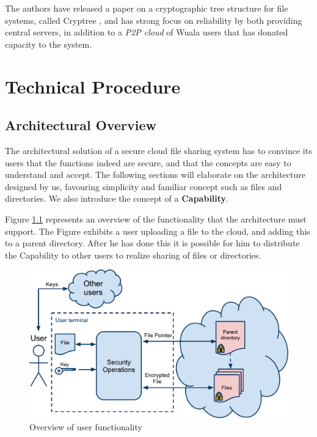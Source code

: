 \documentclass[pdftex,english,10pt,b5paper,twoside]{book}
\begin{document}
The authors have released a paper on a cryptographic tree structure for file
systems, called Cryptree \cite{cryptree}, and has strong focus on reliability
by both providing central servers, in addition to a \emph{P2P cloud} of Wuala
users that has donated capacity to the system.

\chapter{Technical Procedure}
\section{Architectural Overview}
\label{chap:AS}

The architectural solution of a secure cloud file sharing system has to
convince its users that the functions indeed are secure, and that the concepts
are easy to understand and accept. The following sections will elaborate on the
architecture designed by us, favouring simplicity and familiar concept such as
files and directories. We also introduce the concept of a \textbf{Capability}.

Figure \ref{fig:AS:overview} represents an overview of the functionality that
the architecture must support. The Figure exhibits a user uploading a file to
the cloud, and adding this to a parent directory. After he has done this it is
possible for him to distribute the Capability to other users to realize sharing
of files or directories.

\begin{figure}[h!]
    \centering
    \includegraphics[width=\columnwidth]{ArchitectureOverview.pdf}
    \caption{Overview of user functionality}
    \label{fig:AS:overview}
\end{figure}
\end{document}
